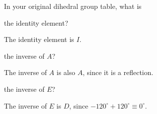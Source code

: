 \documentclass[../key.tex]{subfiles}
\begin{document}
\begin{outer_problem}
\item In your original dihedral group table, what is
\end{outer_problem}

\begin{inner_problem}[start=1]
\item the identity element?
\end{inner_problem}

\noindent The identity element is $I$.

\begin{inner_problem}
\item the inverse of $A$?
\end{inner_problem}

\noindent The inverse of $A$ is also $A$, since it is a reflection.

\begin{inner_problem}
\item the inverse of $E$?
\end{inner_problem}

\noindent The inverse of $E$ is $D$, since $-120^\circ+120^\circ\equiv 0^\circ$.
\end{document}
